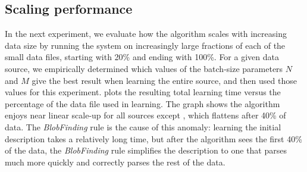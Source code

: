 


\subsection{Scaling performance}
In the next experiment, we evaluate how the algorithm scales with increasing data size by running
the system on increasingly large fractions of each of the small data files, starting with 20\% and ending with 100\%.
For a given data source, we empirically determined which values of the batch-size parameters $N$ and $M$ give the best result when learning the entire source, 
and then used those values for this experiment.  
 plots the resulting total learning time versus the 
percentage of the data file used in learning.   
The graph shows the algorithm enjoys
near linear scale-up for all sources except , which flattens after 40\% of
data.  The \emph{BlobFinding} rule is the cause of this anomaly: learning the initial description takes a relatively long time, but after the algorithm sees the first 40\% of the data, the \emph{BlobFinding} rule simplifies the description to one that parses much more quickly and correctly parses the rest of the data.  

